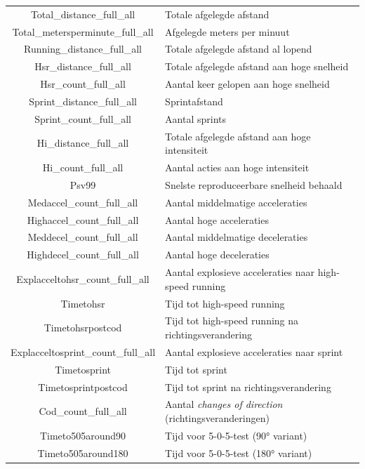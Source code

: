 \begin{longtable}{ c | p{10cm} }
Total\_distance\_full\_all & Totale afgelegde afstand \\
Total\_metersperminute\_full\_all & Afgelegde meters per minuut \\
Running\_distance\_full\_all & Totale afgelegde afstand al lopend \\
Hsr\_distance\_full\_all & Totale afgelegde afstand aan hoge snelheid \\
Hsr\_count\_full\_all & Aantal keer gelopen aan hoge snelheid \\
Sprint\_distance\_full\_all & Sprintafstand \\
Sprint\_count\_full\_all & Aantal sprints \\
Hi\_distance\_full\_all & Totale afgelegde afstand aan hoge intensiteit \\
Hi\_count\_full\_all & Aantal  acties aan hoge intensiteit \\

Psv99 & Snelste reproduceerbare snelheid behaald \\

Medaccel\_count\_full\_all & Aantal middelmatige acceleraties \\
Highaccel\_count\_full\_all & Aantal hoge acceleraties \\
Meddecel\_count\_full\_all & Aantal middelmatige deceleraties \\
Highdecel\_count\_full\_all & Aantal hoge deceleraties \\

Explacceltohsr\_count\_full\_all & Aantal explosieve acceleraties naar high-speed running \\
Timetohsr & Tijd tot high-speed running \\
Timetohsrpostcod & Tijd tot high-speed running na richtingsverandering \\

Explacceltosprint\_count\_full\_all & Aantal explosieve acceleraties naar sprint \\
Timetosprint & Tijd tot sprint \\
Timetosprintpostcod & Tijd tot sprint na richtingsverandering \\

Cod\_count\_full\_all & Aantal \emph{changes of direction} (richtingsveranderingen) \\
Timeto505around90 & Tijd voor 5-0-5-test (90° variant) \\
Timeto505around180 & Tijd voor 5-0-5-test (180° variant) \\

\hline
\end{longtable}

